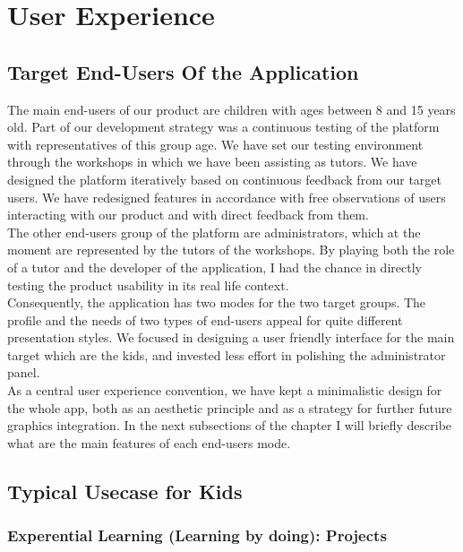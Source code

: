 
\chapter{User Experience}


\section{Target End-Users Of the Application}

The main end-users of our product are children with ages between 8 and 15 years old. Part of our development strategy was a continuous testing of the platform with representatives of this group age. We have set our testing environment through the workshops in which we have been assisting as tutors. 
We have designed the platform iteratively based on continuous feedback from our target users. We have redesigned features in accordance with free observations of users interacting with our product and with direct feedback from them. \\

The other end-users group of the platform are administrators, which at the moment are represented by the tutors of the workshops. By playing both the role of a tutor and the developer of the application, I had the chance in directly testing the product usability in its real life context.\\

Consequently, the application has two modes for the two target groups. The profile and the needs of two types of end-users appeal for quite different presentation styles. We focused in designing a user friendly interface for the main target which are the kids, and invested less effort in polishing the administrator panel.	\\

As a central user experience convention, we have kept a minimalistic design for the whole app, both as an aesthetic principle and as a strategy for further future graphics integration.	
In the next subsections of the chapter I will briefly describe what are the main features of each end-users mode.


\section{Typical Usecase for Kids}

\subsection{Experential Learning (Learning by doing): Projects}

